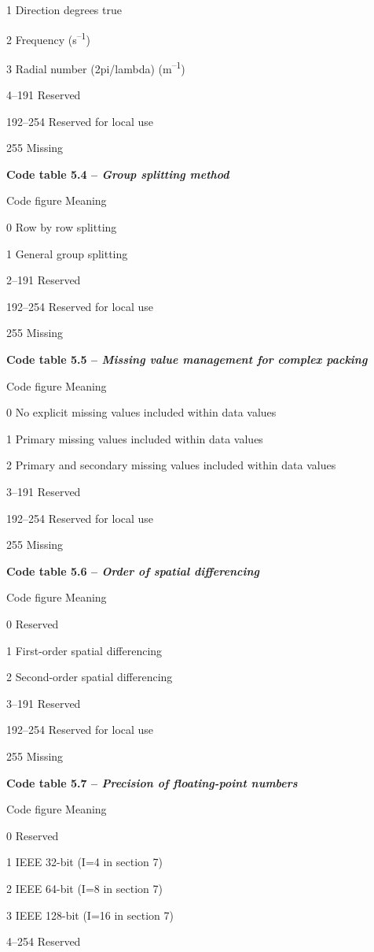 1 Direction degrees true

2 Frequency (s\textsuperscript{--1})

3 Radial number (2pi/lambda) (m\textsuperscript{--1})

4--191 Reserved

192--254 Reserved for local use

255 Missing

\textbf{Code table 5.4 -- \emph{Group splitting method}}

Code figure Meaning

0 Row by row splitting

1 General group splitting

2--191 Reserved

192--254 Reserved for local use

255 Missing

\textbf{Code table 5.5 -- \emph{Missing value management for complex packing}}

Code figure Meaning

0 No explicit missing values included within data values

1 Primary missing values included within data values

2 Primary and secondary missing values included within data values

3--191 Reserved

192--254 Reserved for local use

255 Missing

\textbf{Code table 5.6 -- \emph{Order of spatial differencing}}

Code figure Meaning

0 Reserved

1 First-order spatial differencing

2 Second-order spatial differencing

3--191 Reserved

192--254 Reserved for local use

255 Missing

\textbf{Code table 5.7 -- \emph{Precision of floating-point numbers}}

Code figure Meaning

0 Reserved

1 IEEE 32-bit (I=4 in section 7)

2 IEEE 64-bit (I=8 in section 7)

3 IEEE 128-bit (I=16 in section 7)

4--254 Reserved

